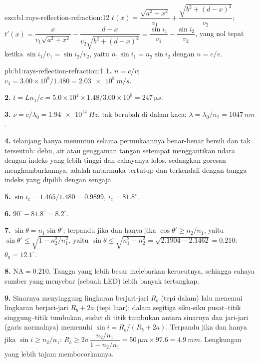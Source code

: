 \begin{solution}{exo:b1:rays-reflection-refraction:12}
$t(x) = \dfrac{\sqrt{a^2 + x^2}}{v_1} + \dfrac{\sqrt{b^2 + (d - x)^2}}{v_2}$;
$t'(x) = \dfrac{x}{v_1\sqrt{a^2 + x^2}} - \dfrac{d - x}{v_2\sqrt{b^2 + (d - x)^2}}
= \dfrac{\sin i_1}{v_1} - \dfrac{\sin i_2}{v_2}$, yang nol tepat ketika
$\sin i_1/v_1 = \sin i_2/v_2$, yaitu $n_1\sin i_1 = n_2\sin i_2$ dengan
$n = c/v$.
\end{solution}

\begin{solution}{pb:b1:rays-reflection-refraction:1}
\textbf{1.} $n = c/v$; $v_1 = 3.00\times10^8/1.480 = \qty{2.03e8}{m/s}$.

\textbf{2.} $t = Ln_1/c = 5.0\times10^4 \times 1.48/3.00\times10^8 =
\qty{247}{\micro s}$.

\textbf{3.} $\nu = c/\lambda_0 = \qty{1.94e14}{Hz}$, tak berubah di dalam kaca;
$\lambda = \lambda_0/n_1 = \qty{1047}{nm}$.

\textbf{4.}  telanjang hanya menuntun selama permukaannya benar-benar
bersih dan tak tersentuh: debu, air atau genggaman tangan setempat
menggantikan udara dengan indeks yang lebih tinggi dan cahayanya lolos,
sedangkan goresan menghamburkannya.  adalah antarmuka
tertutup dan terkendali dengan tangga indeks yang dipilih dengan sengaja.

\textbf{5.} $\sin i_c = 1.465/1.480 = 0.9899$, $i_c = 81.8^\circ$.

\textbf{6.} $90^\circ - 81.8^\circ = 8.2^\circ$.

\textbf{7.} $\sin\theta = n_1\sin\theta'$; terpandu jika dan hanya jika $\cos\theta' \geq
n_2/n_1$, yaitu $\sin\theta' \leq \sqrt{1 - n_2^2/n_1^2}$, yaitu
$\sin\theta \leq \sqrt{n_1^2 - n_2^2} = \sqrt{2.1904 - 2.1462} = 0.210$:
$\theta_a = 12.1^\circ$.

\textbf{8.} $\mathrm{NA} = 0.210$. Tangga yang lebih besar melebarkan
kerucutnya, sehingga cahaya sumber yang menyebar (sebuah LED) lebih banyak tertangkap.

\textbf{9.} Sinarnya menyinggung lingkaran berjari-jari $R_b$ (tepi
dalam) lalu menemui lingkaran berjari-jari $R_b + 2a$ (tepi luar); dalam
segitiga siku-siku pusat--titik singgung--titik tumbukan, sudut di titik
tumbukan antara sinarnya dan jari-jari (garis normalnya) memenuhi
$\sin i = R_b/(R_b + 2a)$. Terpandu jika dan hanya jika $\sin i \geq n_2/n_1$:
$R_b \geq 2a\,\dfrac{n_2/n_1}{1 - n_2/n_1} = \qty{50}{\micro m} \times 97.6
= \qty{4.9}{mm}$. Lengkungan yang lebih tajam membocorkannya.


\end{solution}
